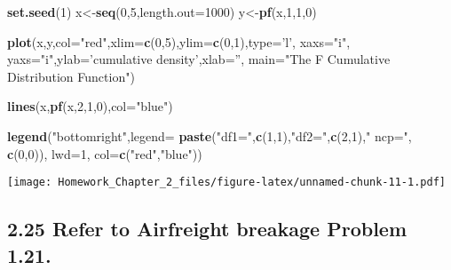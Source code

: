 \documentclass[]{article}
\newenvironment{Shaded}{\begin{snugshade}}{\end{snugshade}}
\newcommand{\KeywordTok}[1]{\textcolor[rgb]{0.13,0.29,0.53}{\textbf{#1}}}
\newcommand{\DataTypeTok}[1]{\textcolor[rgb]{0.13,0.29,0.53}{#1}}
\newcommand{\DecValTok}[1]{\textcolor[rgb]{0.00,0.00,0.81}{#1}}
\newcommand{\StringTok}[1]{\textcolor[rgb]{0.31,0.60,0.02}{#1}}
\newcommand{\NormalTok}[1]{#1}
\begin{document}
\begin{Shaded}
\begin{Highlighting}[]
\KeywordTok{set.seed}\NormalTok{(}\DecValTok{1}\NormalTok{)}
\NormalTok{x<-}\KeywordTok{seq}\NormalTok{(}\DecValTok{0}\NormalTok{,}\DecValTok{5}\NormalTok{,}\DataTypeTok{length.out=}\DecValTok{1000}\NormalTok{)}
\NormalTok{y<-}\KeywordTok{pf}\NormalTok{(x,}\DecValTok{1}\NormalTok{,}\DecValTok{1}\NormalTok{,}\DecValTok{0}\NormalTok{)}

\KeywordTok{plot}\NormalTok{(x,y,}\DataTypeTok{col=}\StringTok{"red"}\NormalTok{,}\DataTypeTok{xlim=}\KeywordTok{c}\NormalTok{(}\DecValTok{0}\NormalTok{,}\DecValTok{5}\NormalTok{),}\DataTypeTok{ylim=}\KeywordTok{c}\NormalTok{(}\DecValTok{0}\NormalTok{,}\DecValTok{1}\NormalTok{),}\DataTypeTok{type=}\StringTok{'l'}\NormalTok{,}
     \DataTypeTok{xaxs=}\StringTok{"i"}\NormalTok{, }\DataTypeTok{yaxs=}\StringTok{"i"}\NormalTok{,}\DataTypeTok{ylab=}\StringTok{'cumulative density'}\NormalTok{,}\DataTypeTok{xlab=}\StringTok{''}\NormalTok{,}
     \DataTypeTok{main=}\StringTok{"The F Cumulative Distribution Function"}\NormalTok{)}

\KeywordTok{lines}\NormalTok{(x,}\KeywordTok{pf}\NormalTok{(x,}\DecValTok{2}\NormalTok{,}\DecValTok{1}\NormalTok{,}\DecValTok{0}\NormalTok{),}\DataTypeTok{col=}\StringTok{"blue"}\NormalTok{)}

\KeywordTok{legend}\NormalTok{(}\StringTok{"bottomright"}\NormalTok{,}\DataTypeTok{legend=}
\KeywordTok{paste}\NormalTok{(}\StringTok{"df1="}\NormalTok{,}\KeywordTok{c}\NormalTok{(}\DecValTok{1}\NormalTok{,}\DecValTok{1}\NormalTok{),}\StringTok{"df2="}\NormalTok{,}\KeywordTok{c}\NormalTok{(}\DecValTok{2}\NormalTok{,}\DecValTok{1}\NormalTok{),}\StringTok{" ncp="}\NormalTok{, }\KeywordTok{c}\NormalTok{(}\DecValTok{0}\NormalTok{,}\DecValTok{0}\NormalTok{)), }\DataTypeTok{lwd=}\DecValTok{1}\NormalTok{, }\DataTypeTok{col=}\KeywordTok{c}\NormalTok{(}\StringTok{"red"}\NormalTok{,}\StringTok{"blue"}\NormalTok{))}
\end{Highlighting}
\end{Shaded}

\texttt{[image: Homework\_Chapter\_2\_files/figure-latex/unnamed-chunk-11-1.pdf]}

\subsection{\texorpdfstring{2.25 Refer to \textbf{Airfreight breakage}
Problem
1.21.}{2.25 Refer to Airfreight breakage Problem 1.21.}}\label{refer-to-airfreight-breakage-problem-1.21.-2}
\end{document}
